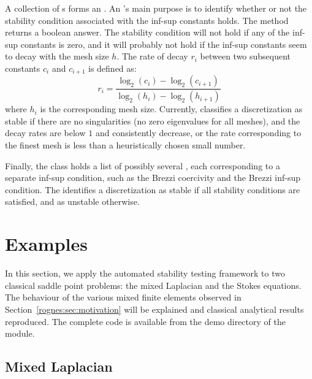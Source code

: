 A collection of s forms
an . An 's
main purpose is to identify whether or not the stability condition
associated with the inf-sup constants holds. The
method  returns a boolean answer. The
stability condition will not hold if any of the inf-sup constants is
zero, and it will probably not hold if the inf-sup constants seem to
decay with the mesh size $h$.  The rate of decay $r_i$ between two
subsequent constants $c_i$ and $c_{i+1}$ is defined as:
\begin{equation*}
  r_i = \frac{\log_2(c_i) - \log_2(c_{i+1})}{\log_2(h_i) -
    \log_2(h_{i+1})}
\end{equation*}
where $h_i$ is the corresponding mesh size. Currently, \rognesascot{}
classifies a discretization as stable if there are no singularities
(no zero eigenvalues for all meshes), and the decay rates are below
$1$ and consistently decrease, or the rate corresponding to the finest
mesh is less than a heuristically chosen small number.

Finally, the  class holds a list of
possibly several , each
corresponding to a separate inf-sup condition, such as the Brezzi
coercivity and the Brezzi inf-sup condition. The
 identifies a discretization as
stable if all stability conditions are satisfied, and as unstable
otherwise.

\section{Examples}
\label{rognes:sec:examples}

In this section, we apply the automated stability testing framework to
two classical saddle point problems: the mixed Laplacian and the
Stokes equations. The behaviour of the various mixed finite elements
observed in Section~\ref{rognes:sec:motivation} will be explained and
classical analytical results reproduced. The complete code is
available from the demo directory of the \rognesascot{} module.

\subsection{Mixed Laplacian}

